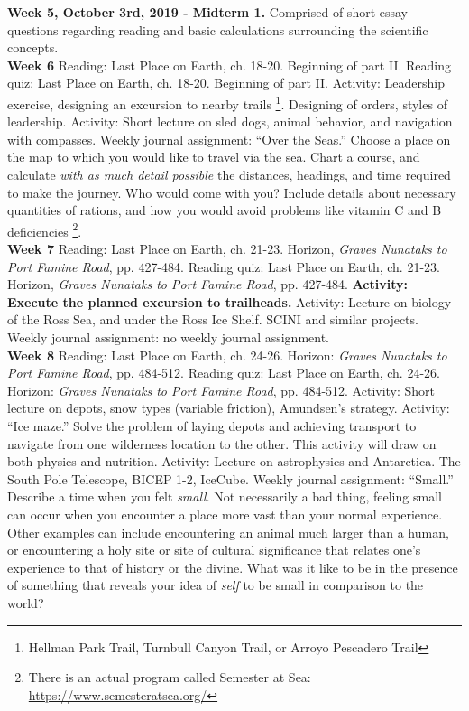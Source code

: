\documentclass[10pt]{article}
\begin{document}
\begin{outline}[enumerate]
\1 \textbf{Week 5, October 3rd, 2019 - Midterm 1.} Comprised of short essay questions regarding reading and basic calculations surrounding the scientific concepts. \\
\clearpage
\1 \textbf{Week 6}
\2 Reading: Last Place on Earth, ch. 18-20. Beginning of part II.
\2 Reading quiz: Last Place on Earth, ch. 18-20. Beginning of part II.
\2 Activity: Leadership exercise, designing an excursion to nearby trails \footnote{Hellman Park Trail, Turnbull Canyon Trail, or Arroyo Pescadero Trail}. Designing of orders, styles of leadership.
\2 Activity: Short lecture on sled dogs, animal behavior, and navigation with compasses.
\2 Weekly journal assignment: ``Over the Seas.''  Choose a place on the map to which you would like to travel via the sea.  Chart a course, and calculate \textit{with as much detail possible} the distances, headings, and time required to make the journey.  Who would come with you?  Include details about necessary quantities of rations, and how you would avoid problems like vitamin C and B deficiencies \footnote{There is an actual program called Semester at Sea: \url{https://www.semesteratsea.org/}}. \\
\1 \textbf{Week 7}
\2 Reading: Last Place on Earth, ch. 21-23. Horizon, \textit{Graves Nunataks to Port Famine Road}, pp. 427-484.
\2 Reading quiz: Last Place on Earth, ch. 21-23. Horizon, \textit{Graves Nunataks to Port Famine Road}, pp. 427-484.
\2 \textbf{Activity: Execute the planned excursion to trailheads.}
\2 Activity: Lecture on biology of the Ross Sea, and under the Ross Ice Shelf. SCINI and similar projects.
\2 Weekly journal assignment: no weekly journal assignment. \\
\1 \textbf{Week 8}
\2 Reading: Last Place on Earth, ch. 24-26. Horizon: \textit{Graves Nunataks to Port Famine Road}, pp. 484-512.
\2 Reading quiz: Last Place on Earth, ch. 24-26. Horizon: \textit{Graves Nunataks to Port Famine Road}, pp. 484-512.
\2 Activity: Short lecture on depots, snow types (variable friction), Amundsen's strategy.
\2 Activity: ``Ice maze.''  Solve the problem of laying depots and achieving transport to navigate from one wilderness location to the other.  This activity will draw on both physics and nutrition.
\2 Activity: Lecture on astrophysics and Antarctica.  The South Pole Telescope, BICEP 1-2, IceCube.
\2 Weekly journal assignment: ``Small.'' Describe a time when you felt \textit{small}.  Not necessarily a bad thing, feeling small can occur when you encounter a place more vast than your normal experience.  Other examples can include encountering an animal much larger than a human, or encountering a holy site or site of cultural significance that relates one's experience to that of history or the divine.  What was it like to be in the presence of something that reveals your idea of \textit{self} to be small in comparison to the world? \\

\end{outline}
\end{document}
